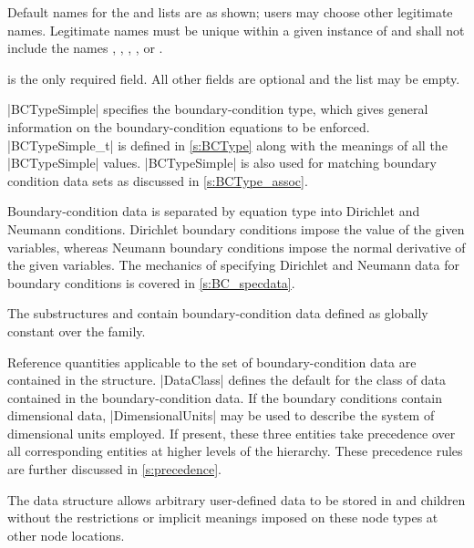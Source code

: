 \begin{notes}
\item Default names for the  and
       lists are as shown; users may choose other
      legitimate names.
      Legitimate names must be unique within a given instance
      of  and shall not include the names
      ,
      , , ,
       or .
\item {} is the only required field.
      All other fields are optional and the  list
      may be empty.
\end{notes}

|BCTypeSimple| specifies the boundary-condition type, which gives general
information on the bound\-ary-con\-di\-tion equations to be enforced.
|BCTypeSimple_t| is defined in \autoref{s:BCType} along with the meanings
of all the |BCTypeSimple| values.
|BCTypeSimple| is also used for matching boundary condition data sets as
discussed in \autoref{s:BCType_assoc}.

Boundary-condition data is separated by equation type into Dirichlet
and Neumann conditions.  Dirichlet boundary conditions impose the
value of the given variables, whereas Neumann boundary conditions
impose the normal derivative of the given variables.  The mechanics of
specifying Dirichlet and Neumann data for boundary conditions is covered
in \autoref{s:BC_specdata}.

The substructures  and  contain
boundary-condition data defined as globally constant over the family.

Reference quantities applicable to the set of boundary-condition data are
contained in the  structure.
|DataClass| defines the default for the class of data contained in the
boundary-condition data.
If the boundary conditions contain dimensional data, |DimensionalUnits|
may be used to describe the system of dimensional units employed.
If present, these three entities take precedence over all corresponding
entities at higher levels of the hierarchy.
These precedence rules are further discussed in \autoref{s:precedence}.

The  data structure allows arbitrary
user-defined data to be stored in  and
 children without the restrictions or implicit
meanings imposed on these node types at other node locations.

